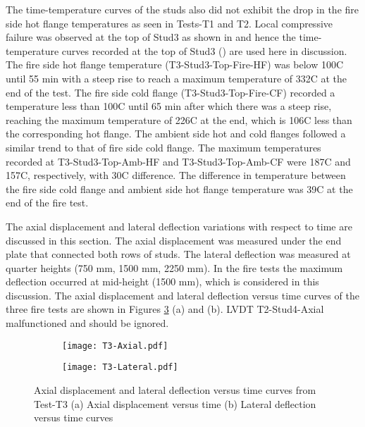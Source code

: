 The time-temperature curves of the studs also did not exhibit the drop in the fire side hot flange temperatures as seen in Tests-T1 and T2. Local compressive failure was observed at the top of Stud3 as shown in  and hence the time-temperature curves recorded at the top of Stud3 () are used here in discussion. The fire side hot flange temperature (T3-Stud3-Top-Fire-HF) was below 100\degree C until 55 min with a steep rise to reach a maximum temperature of 332\degree C at the end of the test. The fire side cold flange (T3-Stud3-Top-Fire-CF) recorded a temperature less than 100\degree C until 65 min after which there was a steep rise, reaching the maximum temperature of 226\degree C at the end, which is 106\degree C less than the corresponding hot flange. The ambient side hot and cold flanges followed a similar trend to that of fire side cold flange. The maximum temperatures recorded at T3-Stud3-Top-Amb-HF and T3-Stud3-Top-Amb-CF were 187\degree C and 157\degree C, respectively, with 30\degree C difference. The difference in temperature between the fire side cold flange and ambient side hot flange temperature was 39\degree C at the end of the fire test.

The axial displacement and lateral deflection variations with respect to time are discussed in this section. The axial displacement was measured under the end plate that connected both rows of studs. The lateral deflection was measured at quarter heights (750 mm, 1500 mm, 2250 mm). In the fire tests the maximum deflection occurred at mid-height (1500 mm), which is considered in this discussion. The axial displacement and lateral deflection versus time curves of the three fire tests are shown in Figures \ref{fig:T3-Axial-Lateral} (a) and (b). LVDT T2-Stud4-Axial malfunctioned and should be ignored.
\begin{figure}[!htbp]
	\centering
	\begin{subfigure}[b]{0.7\textwidth}
		\centering
		\texttt{[image: T3-Axial.pdf]}
		\caption{}
		\label{subfig:T3-Axial}
	\end{subfigure}
	\begin{subfigure}[b]{0.7\textwidth}
		\centering
		\texttt{[image: T3-Lateral.pdf]}
		\caption{}
		\label{subfig:T3-Lateral}
	\end{subfigure}
	   \caption{Axial displacement and lateral deflection versus time curves from Test-T3 (a) Axial displacement versus time (b) Lateral deflection versus time curves}
	   \label{fig:T3-Axial-Lateral}
\end{figure}

